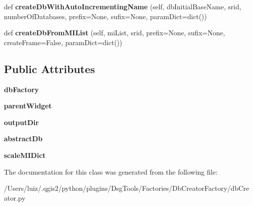 \begin{DoxyCompactItemize}
\item 
\mbox{\label{class_dsg_tools_1_1_factories_1_1_db_creator_factory_1_1db_creator_1_1_db_creator_a7fa51b278d2c66f278f9f9f5cda26f3c}} 
def {\bfseries create\+Db\+With\+Auto\+Incrementing\+Name} (self, db\+Initial\+Base\+Name, srid, number\+Of\+Databases, prefix=None, sufix=None, param\+Dict=dict())
\item 
\mbox{\label{class_dsg_tools_1_1_factories_1_1_db_creator_factory_1_1db_creator_1_1_db_creator_af6049a4be157ab98ef89c93a757107c9}} 
def {\bfseries create\+Db\+From\+M\+I\+List} (self, mi\+List, srid, prefix=None, sufix=None, create\+Frame=False, param\+Dict=dict())
\end{DoxyCompactItemize}
\subsection*{Public Attributes}
\begin{DoxyCompactItemize}
\item 
\mbox{\label{class_dsg_tools_1_1_factories_1_1_db_creator_factory_1_1db_creator_1_1_db_creator_a949a3f52abcd1678391d04cf3cd65647}} 
{\bfseries db\+Factory}
\item 
\mbox{\label{class_dsg_tools_1_1_factories_1_1_db_creator_factory_1_1db_creator_1_1_db_creator_afad5f71626c6c94ea2f5eee9ff81875a}} 
{\bfseries parent\+Widget}
\item 
\mbox{\label{class_dsg_tools_1_1_factories_1_1_db_creator_factory_1_1db_creator_1_1_db_creator_ab4862ca5b4eaf57d0767d82afdc80325}} 
{\bfseries output\+Dir}
\item 
\mbox{\label{class_dsg_tools_1_1_factories_1_1_db_creator_factory_1_1db_creator_1_1_db_creator_aef703aae1c486aebae7150fa7fe21225}} 
{\bfseries abstract\+Db}
\item 
\mbox{\label{class_dsg_tools_1_1_factories_1_1_db_creator_factory_1_1db_creator_1_1_db_creator_af94ab399e3c5927b7f5dc1c9824785db}} 
{\bfseries scale\+M\+I\+Dict}
\end{DoxyCompactItemize}


The documentation for this class was generated from the following file\+:\begin{DoxyCompactItemize}
\item 
/\+Users/luiz/.\+qgis2/python/plugins/\+Dsg\+Tools/\+Factories/\+Db\+Creator\+Factory/db\+Creator.\+py\end{DoxyCompactItemize}
